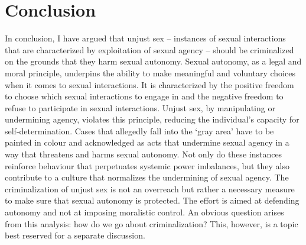 \section*{Conclusion}
In conclusion, I have argued that unjust sex -- instances of sexual
interactions that are characterized by exploitation of sexual agency --
should be criminalized on the grounds that they harm sexual autonomy.
Sexual autonomy, as a legal and moral principle, underpins the ability
to make meaningful and voluntary choices when it comes to sexual
interactions. It is characterized by the positive freedom to choose
which sexual interactions to engage in and the negative freedom to
refuse to participate in sexual interactions. Unjust sex, by
manipulating or undermining agency, violates this principle, reducing
the individual's capacity for self-determination. Cases that allegedly
fall into the `gray area' have to be painted in colour and acknowledged
as acts that undermine sexual agency in a way that threatens and harms
sexual autonomy. Not only do these instances reinforce behaviour that
perpetuates systemic power imbalances, but they also contribute to a
culture that normalizes the undermining of sexual agency. The
criminalization of unjust sex is not an overreach but rather a necessary
measure to make sure that sexual autonomy is protected. The effort is
aimed at defending autonomy and not at imposing moralistic control. An
obvious question arises from this analysis: how do we go about
criminalization? This, however, is a topic best reserved for a separate
discussion.

\let\section\sectionDefault
\let\titleformat\titleformatDefault



